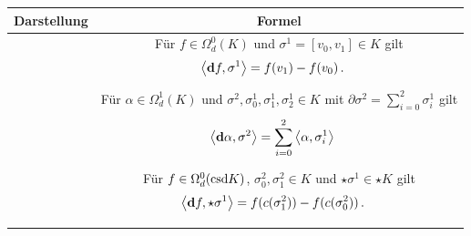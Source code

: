   
    \begin{table}[htbp]
    \begin{tabular}{|c|c|} \hline
      Darstellung & Formel \\\hline
      \begin{minipage}[c]{0.29\textwidth}
        \centering
      \end{minipage} &
      \begin{minipage}[c]{0.69\textwidth}
        Für \( f\in\Omega_{d}^{0}(K) \) und \( \sigma^{1}=\left[ v_{0}, v_{1} \right]\in K \) gilt
        {\begin{align}
          \label{eqAbleitungKante}
          \left\langle \mathbf{d} f , \sigma^{1} \right\rangle &= f(v_{1}) - f(v_{0}) \,\text{.}
        \end{align}}
      \end{minipage} \\\hline
      \begin{minipage}[c]{0.29\textwidth}
        \centering
      \end{minipage} &
      \begin{minipage}[c]{0.69\textwidth}
      Für \( \alpha\in\Omega_{d}^{1}(K) \) und \( \sigma^{2},\sigma^{1}_{0},\sigma^{1}_{1},\sigma^{1}_{2} \in K \) 
      mit \( \partial\sigma^{2} = \sum_{i=0}^{2} \sigma^{1}_{i} \) gilt
        {\begin{align}
          \left\langle \mathbf{d} \alpha , \sigma^{2} \right\rangle &= \sum_{i=0}^{2} \left\langle \alpha, \sigma_{i}^{1}\right\rangle
        \end{align}}
      \end{minipage} \\\hline
      \begin{minipage}[c]{0.29\textwidth}
        \centering
      \end{minipage} &
      \begin{minipage}[c]{0.69\textwidth}
        Für \( f\in\Omega_{d}^{0}(\text{csd} K) \), \( \sigma^{2}_{0}, \sigma^{2}_{1} \in K \) und 
        \( \star\sigma^{1} \in \star K \) gilt
        {\begin{align}
          \left\langle \mathbf{d} f , \star\sigma^{1} \right\rangle &= f(c(\sigma^{2}_{1})) - f(c(\sigma^{2}_{0})) \,\text{.}
        \end{align}}
      \end{minipage} \\\hline
      \begin{minipage}[c]{0.30\textwidth}

\end{minipage}
\end{tabular}
\end{table}

